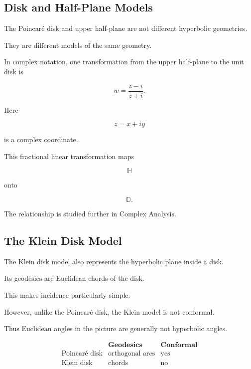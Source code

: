 \subsection{Disk and Half-Plane Models}
\label{subsec:disk-half-plane-equivalence}

The Poincar\'e disk and upper half-plane are not different hyperbolic
geometries.

They are different models of the same geometry.

In complex notation, one transformation from the upper half-plane to the
unit disk is

\[
\boxed{
w=\frac{z-i}{z+i}.
}
\]

Here

\[
z=x+iy
\]

is a complex coordinate.

This fractional linear transformation maps

\[
\mathbb{H}
\]

onto

\[
\mathbb{D}.
\]

The relationship is studied further in Complex Analysis.

\subsection{The Klein Disk Model}
\label{subsec:klein-disk}

The Klein disk model also represents the hyperbolic plane inside a disk.

Its geodesics are Euclidean chords of the disk.

This makes incidence particularly simple.

However, unlike the Poincar\'e disk, the Klein model is not conformal.

Thus Euclidean angles in the picture are generally not hyperbolic angles.

\[
\boxed{
\begin{array}{c|c|c}
& \textbf{Geodesics} & \textbf{Conformal}\\
\hline
\text{Poincar\'e disk} &
\text{orthogonal arcs} &
\text{yes}\\
\text{Klein disk} &
\text{chords} &
\text{no}
\end{array}
}
\]

